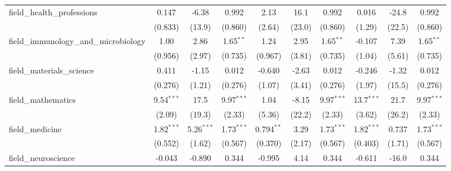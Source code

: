 \begin{tabular}{lccccccccc}
   field\_health\_professions                                  & 0.147          & -6.38          & 0.992          & 2.13           & 16.1          & 0.992          & 0.016          & -24.8          & 0.992\\   
                                                               & (0.833)        & (13.9)         & (0.860)        & (2.64)         & (23.0)        & (0.860)        & (1.29)         & (22.5)         & (0.860)\\   
   field\_immunology\_and\_microbiology                        & 1.00           & 2.86           & 1.65$^{**}$    & 1.24           & 2.95          & 1.65$^{**}$    & -0.107         & 7.39           & 1.65$^{**}$\\   
                                                               & (0.956)        & (2.97)         & (0.735)        & (0.967)        & (3.81)        & (0.735)        & (1.04)         & (5.61)         & (0.735)\\   
   field\_materials\_science                                   & 0.411          & -1.15          & 0.012          & -0.640         & -2.63         & 0.012          & -0.246         & -1.32          & 0.012\\   
                                                               & (0.276)        & (1.21)         & (0.276)        & (1.07)         & (3.41)        & (0.276)        & (1.97)         & (15.5)         & (0.276)\\   
   field\_mathematics                                          & 9.54$^{***}$   & 17.5           & 9.97$^{***}$   & 1.04           & -8.15         & 9.97$^{***}$   & 13.7$^{***}$   & 21.7           & 9.97$^{***}$\\   
                                                               & (2.09)         & (19.3)         & (2.33)         & (5.36)         & (22.2)        & (2.33)         & (3.62)         & (26.2)         & (2.33)\\   
   field\_medicine                                             & 1.82$^{***}$   & 5.26$^{***}$   & 1.73$^{***}$   & 0.794$^{**}$   & 3.29          & 1.73$^{***}$   & 1.82$^{***}$   & 0.737          & 1.73$^{***}$\\   
                                                               & (0.552)        & (1.62)         & (0.567)        & (0.370)        & (2.17)        & (0.567)        & (0.403)        & (1.71)         & (0.567)\\   
   field\_neuroscience                                         & -0.043         & -0.890         & 0.344          & -0.995         & 4.14          & 0.344          & -0.611         & -16.0          & 0.344\\   

\end{tabular}
